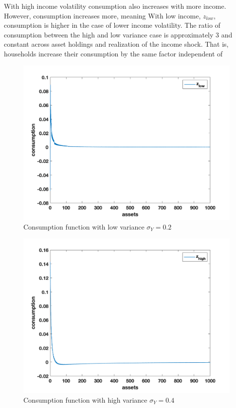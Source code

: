 \documentclass[letterpaper,12pt]{article}
\begin{document}
With high income volatility consumption also increases with more income. However, consumption increases more, meaning 
With low income, $z_{low}$, consumption is higher in the case of lower income volatility.
 The ratio of consumption between the high and low variance case is approximately 3 and constant across asset holdings and realization of the income shock. That is, households increase their consumption by the same factor independent of 
\begin{figure}
\includegraphics[scale=0.5]{Figures/Part1_PE/consFunc_inf_comp1}
\caption{Consumption function with low variance $\sigma_Y = 0.2$}
\end{figure}
\begin{figure}
\includegraphics[scale=0.45]{Figures/Part1_PE/consFunc_inf_comp2}
\caption{Consumption function with high variance $\sigma_Y = 0.4$}
\end{figure}
\end{document}
